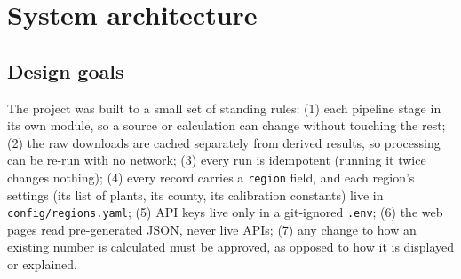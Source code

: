 \documentclass[11pt,a4paper]{article}
\newcommand{\code}[1]{\nolinkurl{#1}}      %
\begin{document}
\section{System architecture}
\label{sec:architecture}

\subsection{Design goals}
The project was built to a small set of standing rules: (1) each pipeline stage in its own module, so a source
or calculation can change without touching the rest; (2) the raw downloads are cached separately from derived
results, so processing can be re-run with no network; (3) every run is idempotent (running it twice changes
nothing); (4) every record carries a \code{region} field, and each region's settings (its list of plants, its
county, its calibration constants) live in \code{config/regions.yaml}; (5) API keys live only in a git-ignored
\code{.env}; (6) the web pages read pre-generated JSON, never live APIs; (7) any change to how an existing number is
calculated must be approved, as opposed to how it is displayed or explained.
\end{document}
